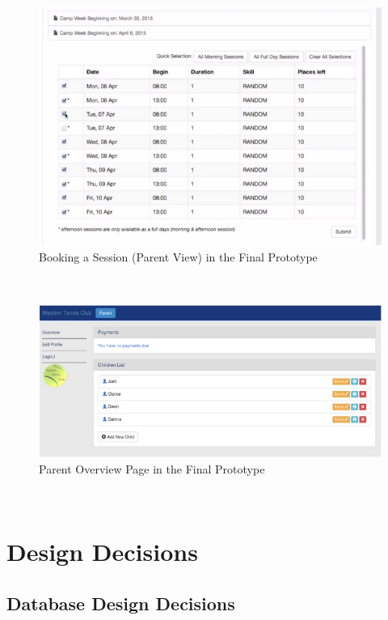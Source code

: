 \documentclass{l3proj}
\begin{document}
\\ 
{
\begin{figure}[h]
\caption{Booking a Session (Parent View) in the Final Prototype}
\centering
\includegraphics[scale=0.75]{parenttableFinal.jpg}
\end{figure}
}
\\
{
\begin{figure}[h]
\caption{Parent Overview Page in the Final Prototype}
\centering
\includegraphics[scale=0.75]{parentlistofchildren.jpg}
\end{figure}
}
\\

\section{Design Decisions}

\subsection{Database Design Decisions}
\end{document}

